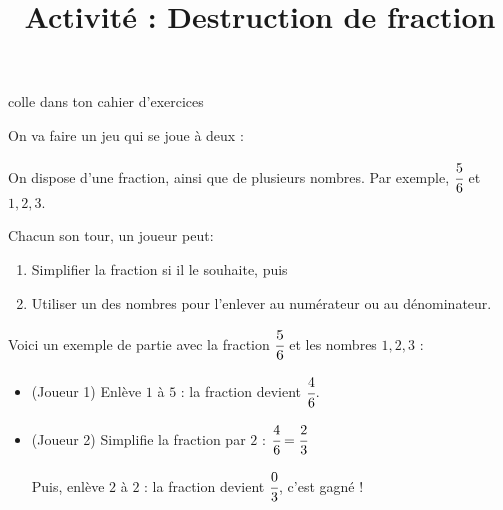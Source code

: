\documentclass[a4paper,11pt]{article}
\title{Activité : Destruction de fraction}
\date{}
\author{}
\makeatletter
\renewcommand{\maketitle}{%
{\scriptsize colle dans ton cahier d'exercices}
	\begin{center}
		\LARGE
		\myuline{\@title}
		\vspace{0.5em}
	\end{center}
}
\makeatother
\begin{document}
\maketitle

\begin{enonce}
	On va faire un jeu qui se joue à deux :

	On dispose d'une fraction, ainsi que de plusieurs nombres. Par exemple, $\cfrac{5}{6}$ et $1, 2, 3$.

	Chacun son tour, un joueur peut:
	\begin{enumerate}
		\item Simplifier la fraction si il le souhaite, puis
		\item Utiliser un des nombres pour l'enlever au numérateur ou au dénominateur.
	\end{enumerate}

	Voici un exemple de partie avec la fraction $\cfrac{5}{6}$ et les nombres $1, 2, 3$ :
	\begin{itemize}
		\item (Joueur 1) Enlève $1$ à $5$ : la fraction devient $\cfrac{4}{6}$.
		\item (Joueur 2) Simplifie la fraction par $2$ : $\cfrac{4}{6} = \cfrac{2}{3}$
		
		Puis, enlève $2$ à $2$ : la fraction devient $\cfrac{0}{3}$, c'est gagné !
	\end{itemize}
\end{enonce}
\end{document}
